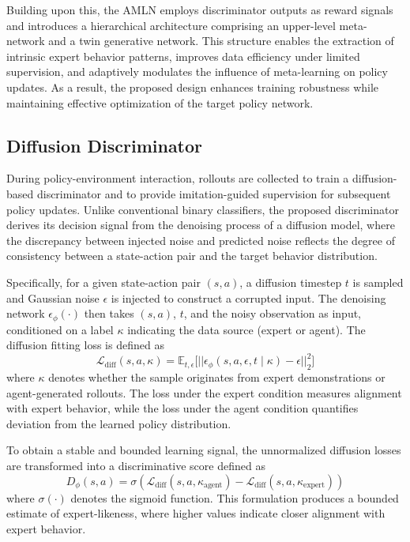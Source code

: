 \documentclass[lettersize,journal]{IEEEtran}
\begin{document}
Building upon this, the AMLN employs discriminator outputs as reward signals and introduces a hierarchical architecture comprising an upper-level meta-network and a twin generative network. This structure enables the extraction of intrinsic expert behavior patterns, improves data efficiency under limited supervision, and adaptively modulates the influence of meta-learning on policy updates. As a result, the proposed design enhances training robustness while maintaining effective optimization of the target policy network.

\subsection{Diffusion Discriminator}
During policy-environment interaction, rollouts are collected to train a diffusion-based discriminator and to provide imitation-guided supervision for subsequent policy updates. Unlike conventional binary classifiers, the proposed discriminator derives its decision signal from the denoising process of a diffusion model, where the discrepancy between injected noise and predicted noise reflects the degree of consistency between a state-action pair and the target behavior distribution.

Specifically, for a given state-action pair $(s,a)$, a diffusion timestep $t$ is sampled and Gaussian noise $\epsilon$ is injected to construct a corrupted input. The denoising network $\epsilon_\phi(\cdot)$ then takes $(s,a)$, $t$, and the noisy observation as input, conditioned on a label $\kappa$ indicating the data source (expert or agent). The diffusion fitting loss is defined as
\begin{equation}
\label{eq:diff_loss_re}
\mathcal{L}_{\text{diff}}(s,a,\kappa)= \mathbb{E}_{t,\epsilon}\Big[||\epsilon_\phi(s,a,\epsilon,t\mid \kappa)-\epsilon||_2^2\Big]
\end{equation}
where $\kappa$ denotes whether the sample originates from expert demonstrations or agent-generated rollouts. The loss under the expert condition measures alignment with expert behavior, while the loss under the agent condition quantifies deviation from the learned policy distribution.

To obtain a stable and bounded learning signal, the unnormalized diffusion losses are transformed into a discriminative score defined as
\begin{equation}
  \label{eq:discriminator}
  D_\phi(s,a)=\sigma\left(\mathcal{L}_{\text{diff}}(s,a,\kappa_{\text{agent}}) -\mathcal{L}_{\text{diff}}(s,a,\kappa_{\text{expert}})\right)
\end{equation}
where $\sigma(\cdot)$ denotes the sigmoid function. This formulation produces a bounded estimate of expert-likeness, where higher values indicate closer alignment with expert behavior.
\end{document}
